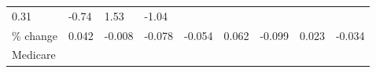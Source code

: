 \documentclass[
]{book}
\begin{document}
\begin{longtable}[]{@{}lllllllll@{}}
\begin{minipage}[t]{0.11\columnwidth}
0.31\strut
\end{minipage} & \begin{minipage}[t]{0.07\columnwidth}\raggedright
-0.74\strut
\end{minipage} & \begin{minipage}[t]{0.07\columnwidth}\raggedright
1.53\strut
\end{minipage} & \begin{minipage}[t]{0.10\columnwidth}\raggedright
-1.04\strut
\end{minipage}\tabularnewline
\begin{minipage}[t]{0.10\columnwidth}\raggedright
\% change\strut
\end{minipage} & \begin{minipage}[t]{0.08\columnwidth}\raggedright
0.042\strut
\end{minipage} & \begin{minipage}[t]{0.09\columnwidth}\raggedright
-0.008\strut
\end{minipage} & \begin{minipage}[t]{0.07\columnwidth}\raggedright
-0.078\strut
\end{minipage} & \begin{minipage}[t]{0.06\columnwidth}\raggedright
-0.054\strut
\end{minipage} & \begin{minipage}[t]{0.11\columnwidth}\raggedright
0.062\strut
\end{minipage} & \begin{minipage}[t]{0.07\columnwidth}\raggedright
-0.099\strut
\end{minipage} & \begin{minipage}[t]{0.07\columnwidth}\raggedright
0.023\strut
\end{minipage} & \begin{minipage}[t]{0.10\columnwidth}\raggedright
-0.034\strut
\end{minipage}\tabularnewline
\begin{minipage}[t]{0.10\columnwidth}\raggedright
Medicare\strut
\end{minipage} & \begin{minipage}[t]{0.08\columnwidth}\raggedright
\strut
\end{minipage} & \begin{minipage}[t]{0.09\columnwidth}\raggedright
\strut
\end{minipage} & \begin{minipage}[t]{0.07\columnwidth}\raggedright
\strut
\end{minipage} & \begin{minipage}[t]{0.06\columnwidth}\raggedright

\end{minipage}
\end{longtable}
\end{document}
